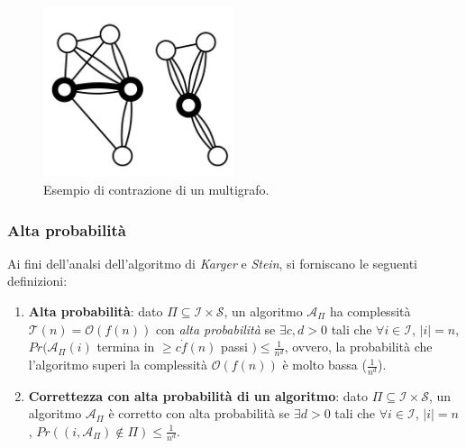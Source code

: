 \begin{figure}[H]
	\centering
	\includegraphics[width=0.5\textwidth]{res/images/multigraph}
	\caption{Esempio di contrazione di un multigrafo.}
	\label{fig:multigraph_contraction}
\end{figure}

\subsubsection*{Alta probabilità}

Ai fini dell'analsi dell'algoritmo di \textit{Karger} e \textit{Stein}, si forniscano le seguenti definizioni:
\begin{enumerate}
    \item \textbf{Alta probabilità}: dato $\Pi \subseteq \mathcal{I} \times \mathcal{S}$, un algoritmo $\mathcal{A}_{\Pi}$ 
    ha complessità $\mathcal{T}(n) = \mathcal{O}(f(n))$ con \textit{alta probabilità} se $\exists c, d > 0$ tali che 
    $\forall i \in \mathcal{I}$, $|i| = n$, $Pr(\mathcal{A}_{\Pi}(i)$ termina in $\ge c \dot f(n)$ passi $) \le \frac{1}{n^d}$, 
    ovvero, la probabilità che l'algoritmo superi la complessità $\mathcal{O}(f(n))$ è molto bassa ($\frac{1}{n^d}$).
    \item \textbf{Correttezza con alta probabilità di un algoritmo}: dato $\Pi \subseteq \mathcal{I} \times \mathcal{S}$, 
    un algoritmo $\mathcal{A}_{\Pi}$ è corretto con alta probabilità se $\exists d > 0$ tali che 
    $\forall i \in \mathcal{I}$, $|i| = n$, $Pr((i, \mathcal{A}_{\Pi}) \notin \Pi) \le \frac{1}{n^d}$.
\end{enumerate}